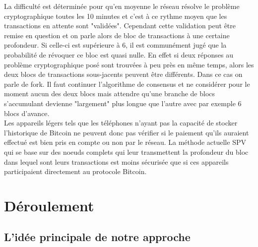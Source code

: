 \documentclass[12pt,a4paper]{article}
\begin{document}
	La difficulté est déterminée pour qu'en moyenne le réseau résolve le problème cryptographique toutes les 10 minutes et c'est à ce rythme moyen que les transactions en attente sont "validées". Cependant cette validation peut être remise en question et on parle alors de bloc de transactions à une certaine profondeur. Si celle-ci est supérieure à 6, il est communément jugé que la probabilité de révoquer ce bloc est quasi nulle. En effet si deux réponses au problème cryptographique posé sont trouvées à peu près en même temps, alors les deux blocs de transactions sous-jacents peuvent être différents. Dans ce cas on parle de fork. Il faut continuer l'algorithme de consensus et ne considérer pour le moment aucun des deux blocs mais attendre qu'une branche de blocs s'accumulant devienne "largement" plus longue que l'autre avec par exemple 6 blocs d'avance.\\ %
	Les appareils légers tels que les téléphones n'ayant pas la capacité de stocker l'historique de Bitcoin ne peuvent donc pas vérifier si le paiement qu'ils auraient effectué est bien pris en compte ou non par le réseau. La méthode actuelle SPV qui se base sur des noeuds complets qui leur transmettent la profondeur du bloc dans lequel sont leurs transactions est moins sécurisée que si ces appareils participaient directement au protocole Bitcoin. %
		
	\section{Déroulement} %
	
	\subsection{L'idée principale de notre approche} %
	
\end{document}
